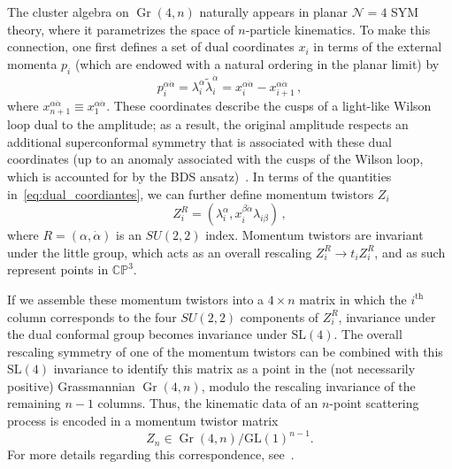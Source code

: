 \documentclass[11pt]{article}
\DeclareMathOperator{\Gr}{Gr}
\begin{document}

The cluster algebra on $\Gr(4,n)$ naturally appears in planar $\mathcal{N}=4$ SYM theory, where it parametrizes the space of $n$-particle kinematics. To make this connection, one first defines a set of dual coordinates $x_i$ in terms of the external momenta $p_i$ (which are endowed with a natural ordering in the planar limit) by
\begin{equation}
p_i^{\alpha \dot \alpha} = \lambda_i^\alpha \tilde \lambda_i^{\dot \alpha} = x_i^{\alpha \dot \alpha} - x_{i+1}^{\alpha \dot \alpha} \, , \label{eq:dual_coordiantes}
\end{equation}
where $x_{n+1}^{\alpha \dot \alpha} \equiv x_1^{\alpha \dot \alpha}$. These coordinates describe the cusps of a light-like Wilson loop dual to the amplitude; as a result, the original amplitude respects an additional superconformal symmetry that is associated with these dual coordinates (up to an anomaly associated with the cusps of the Wilson loop, which is accounted for by the BDS ansatz)~\cite{Bern:2005iz,Drummond:2007au,Bern:2008ap,Drummond:2008aq,Drummond:2006rz,Bern:2006ew,Bern:2007ct,Alday:2007hr,Drummond:2008vq}. In terms of the quantities in~\eqref{eq:dual_coordiantes}, we can further define momentum twistors $Z_i$
\begin{equation}
Z^R_i = (\lambda_i^\alpha, x_i^{\beta \dot \alpha} \lambda_{i \beta}) \, ,
\end{equation}
where $R = (\alpha, \dot \alpha)$ is an $SU(2,2)$ index. Momentum twistors are invariant under the little group, which acts as an overall rescaling $Z_i^R \rightarrow  t_i Z_i^R$, and as such represent points in $\mathbb{CP}^3$. 

If we assemble these momentum twistors into a $4 \times n$ matrix in which the $i^\text{th}$ column corresponds to the four $SU(2,2)$ components of $Z_i^R$, invariance under the dual conformal group becomes invariance under $\text{SL}(4)$. The overall rescaling symmetry of one of the momentum twistors can be combined with this $\text{SL}(4)$ invariance to identify this matrix as a point in the (not necessarily positive) Grassmannian $\Gr(4,n)$, modulo the rescaling invariance of the remaining $n-1$ columns. Thus, the kinematic data of an $n$-point scattering process is encoded in a momentum twistor matrix
\begin{equation}
Z_n \in \Gr(4,n)/\text{GL}(1)^{n-1}. \label{eq:gr4n_momentum_twistor}
\end{equation}
For more details regarding this correspondence, see~\cite{ArkaniHamed:2012nw,Golden:2013xva}. 
\end{document}
